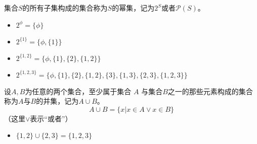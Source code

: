 \documentclass{beamer}
\begin{document}
\begin{CJK*}{UTF8}{gbsn}
\begin{frame}
  \begin{Def}
  集合$S$的所有子集构成的集合称为$S$的幂集，记为$2^S$或者$\mathcal{P}(S)$。
\end{Def}
\begin{Ex}
  \begin{itemize}
  \item       $2^{\phi}=\{\phi\}$
\item     $2^{\{1\}}=\{\phi, \{1\}\}$
\item   $2^{\{1,2\}}=\{\phi, \{1\},\{2\},\{1,2\}\}$
\item   $2^{\{1,2,3\}}=\{\phi, \{1\},\{2\},\{1,2\},\{3\},\{1,3\},\{2,3\},\{1,2,3\}\}$
  \end{itemize}
\end{Ex}

  \end{frame}

  
  \begin{frame}
    \begin{minipage}{0.70\linewidth}
  \begin{Def}
    设$A,B$为任意的两个集合，至少属于集合 $A$ 与集合$B$之一的那些元素构成的集合称为$A$与$B$的并集，记为$A \cup B$。
  \begin{equation*}
      A\cup B = \{x|x \in A \lor x \in B\} 
    \end{equation*}
    （这里$\lor$表示“或者”）
  \end{Def}
\end{minipage}
\begin{minipage}{0.29\linewidth}
 \end{minipage}
 \begin{Ex}
   \begin{itemize}
   \item   $\{1,2\} \cup \{2,3\} = \{1,2,3\}$
   \end{itemize}
\end{Ex}
  \end{frame}


\end{CJK*}
\end{document}
